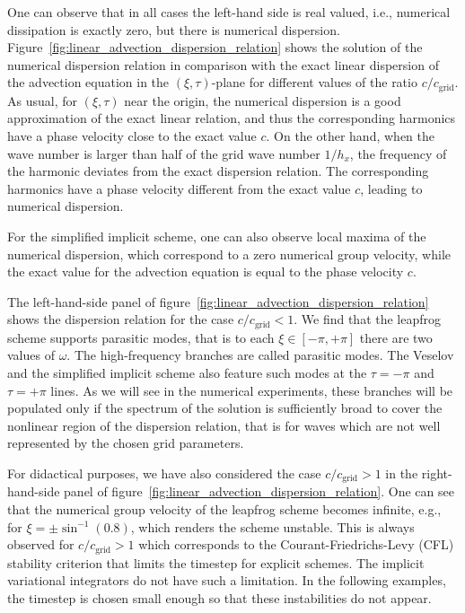 \documentclass[12pt,a4paper,reqno]{article}
\begin{document}
One can observe that in all cases the left-hand side is real valued, i.e., numerical dissipation is exactly zero, but there is numerical dispersion. Figure~\ref{fig:linear_advection_dispersion_relation} shows the solution of the numerical dispersion relation in comparison with the exact linear dispersion of the advection equation in the $(\xi, \tau)$-plane for different values of the ratio $c/c_{\text{grid}}$. 
As usual, for $(\xi,\tau)$ near the origin, the numerical dispersion is a good approximation of the exact linear relation, and thus the corresponding harmonics have a phase velocity close to the exact value $c$. On the other hand, when the wave number is larger than half of the grid wave number $1/h_x$, the frequency of the harmonic deviates from the exact dispersion relation. The corresponding harmonics have a phase velocity different from the exact value $c$, leading to numerical dispersion.

For the simplified implicit scheme, one can also observe local maxima of the numerical dispersion, which correspond to a zero numerical group velocity, while the exact value for the advection equation is equal to the phase velocity $c$.

The left-hand-side panel of figure~\ref{fig:linear_advection_dispersion_relation} shows the dispersion relation for the case $c/c_{\text{grid}} < 1$. We find that the leapfrog scheme supports parasitic modes, that is to each $\xi \in [-\pi, +\pi]$ there are two values of $\omega$. The high-frequency branches are called parasitic modes. The Veselov and the simplified implicit scheme also feature such modes at the $\tau = -\pi$ and $\tau = +\pi$ lines. As we will see in the numerical experiments, these branches will be populated only if the spectrum of the solution is sufficiently broad to cover the nonlinear region of the dispersion relation, that is for waves which are not well represented by the chosen grid parameters.

For didactical purposes, we have also considered the case $c/c_{\text{grid}} > 1$ in the right-hand-side panel of figure~\ref{fig:linear_advection_dispersion_relation}. One can see that the numerical group velocity of the leapfrog scheme becomes infinite, e.g., for $\xi = \pm \sin^{-1} (0.8)$, which renders the scheme unstable. This is always observed for $c/c_{\text{grid}} > 1$ which corresponds to the Courant-Friedrichs-Levy (CFL) stability criterion that limits the timestep for explicit schemes. The implicit variational integrators do not have such a limitation. In the following examples, the timestep is chosen small enough so that these instabilities do not appear.
\end{document}
